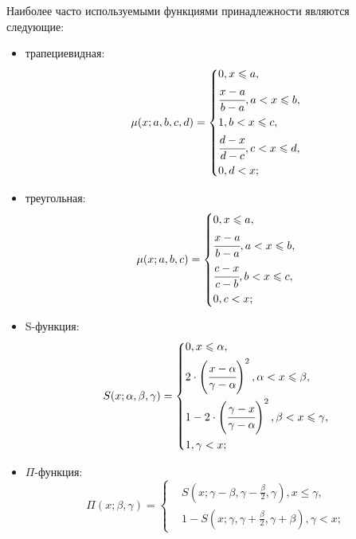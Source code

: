 Наиболее часто используемыми функциями принадлежности являются следующие:
\begin{itemize}
	\item трапециевидная: 
	\begin{equation}
	\label{eq:tr-func}
		\mu(x; a, b, c, d) = \left\{
		\begin{aligned}
			&0, x \leqslant a,\\
			&\cfrac{x-a}{b-a}, \hfill a < x \leqslant b,\\
			&1, \hfill b < x \leqslant c,\\
			&\cfrac{d-x}{d-c}, \hfill c < x \leqslant d,\\
			&0, \hfill d < x;
		\end{aligned} \right.
	\end{equation}
	\item треугольная:	
	\begin{equation}
	\label{eq:triangle-func}
		\mu(x;a, b, c) = \left\{
		\begin{aligned}
			&0, x \leqslant a,\\
			&\cfrac{x-a}{b-a}, a < x \leqslant b,\\
			&\cfrac{c-x}{c-b}, b < x \leqslant c,\\
			&0, c < x;
		\end{aligned}
		\right.
	\end{equation}
	\item S-функция:	
	\begin{equation}
	\label{eq:S-func}
		S(x;\alpha, \beta, \gamma) = \left\{
		\begin{aligned}
			& 0, x \leqslant \alpha,\\
			& 2\cdot \left(\cfrac{x-\alpha}{\gamma-\alpha}\right)^2, \alpha < x \leqslant \beta,\\
			&1 - 2\cdot \left(\cfrac{\gamma-x}{\gamma-\alpha}\right)^2, \beta < x \leqslant \gamma,\\
			&1, \gamma < x;
		\end{aligned}
		\right.
	\end{equation}
	\item $\Pi$-функция:	
	\begin{equation}
	\label{eq:P-func}
		\Pi(x;\beta, \gamma) = \left\{
		\begin{aligned}
			& S(x; \gamma - \beta, \gamma - \frac{\beta}{2}, \gamma), x \leqslant \gamma,\\
			& 1 - S(x; \gamma, \gamma + \frac{\beta}{2}, \gamma + \beta), \gamma < x;
		\end{aligned}

\end{equation}
\end{itemize}
